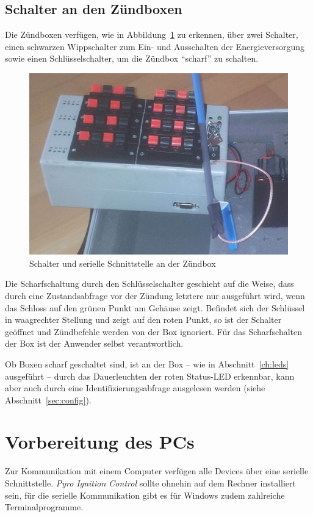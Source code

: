 \documentclass[pdftex, parskip, numbers=noenddot, toc=listof]{scrbook}
\newcommand{\pic}{\emph{Pyro Ignition Control}}
\begin{document}
	\section{Schalter an den Zündboxen}

	Die Zündboxen verfügen, wie in Abbildung~\ref{fig:schalterzuend} zu erkennen, über zwei Schalter, einen schwarzen Wippschalter zum Ein- und Ausschalten der Energieversorgung sowie einen Schlüsselschalter, um die Zündbox \enquote{scharf} zu schalten.

	\begin{figure}[!b]
		\centering
		\includegraphics[width=.6\textwidth]{Bilder/SchalterZuendbox}
		\caption{Schalter und serielle Schnittstelle an der Zündbox}
		\label{fig:schalterzuend}
	\end{figure}

	Die Scharfschaltung durch den Schlüsselschalter geschieht auf die Weise, dass durch eine Zustandsabfrage vor der Zündung letztere nur ausgeführt wird, wenn das Schloss auf den grünen Punkt am Gehäuse zeigt. Befindet sich der Schlüssel in waagrechter Stellung und zeigt auf den roten Punkt, so ist der Schalter geöffnet und Zündbefehle werden von der Box ignoriert. Für das Scharfschalten der Box ist der Anwender selbst verantwortlich.

	Ob Boxen scharf geschaltet sind, ist an der Box -- wie in Abschnitt~\ref{ch:leds} ausgeführt -- durch das Dauerleuchten der roten Status-LED erkennbar, kann aber auch durch eine Identifizierungsabfrage ausgelesen werden (siehe Abschnitt~\ref{sec:config}).


	\chapter{Vorbereitung des PCs}

	Zur Kommunikation mit einem Computer verfügen alle Devices über eine serielle Schnittstelle. {\pic} sollte ohnehin auf dem Rechner installiert sein, für die serielle Kommunikation gibt es für Windows zudem zahlreiche Terminalprogramme.
\end{document}
